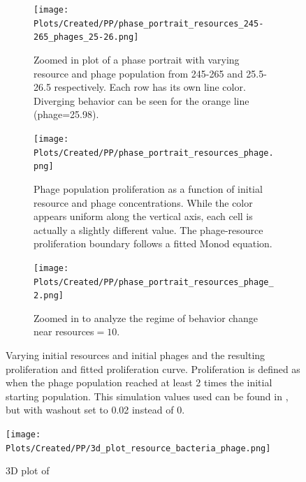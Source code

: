 \begin{figure}[]
    \centering
    \begin{subfigure}{0.49\linewidth}
        \centering
        \texttt{[image: Plots/Created/PP/phase\_portrait\_resources\_245-265\_phages\_25-26.png]}
        \caption{
            Zoomed in plot of a phase portrait with varying resource and phage population from 245-265 and 25.5-26.5 respectively. 
            Each row has its own line color. 
            Diverging behavior can be seen for the orange line (phage=25.98). 
        }
        \label{fig:created:phase_portrait_resources_245-265_phages_25-26}
    \end{subfigure}
    \hfill
    \begin{subfigure}{0.49\linewidth}
        \centering
        \texttt{[image: Plots/Created/PP/phase\_portrait\_resources\_phage.png]}
        \caption{
            Phage population proliferation as a function of initial resource and phage concentrations. 
            While the color appears uniform along the vertical axis, each cell is actually a slightly different value. 
            The phage-resource proliferation boundary follows a fitted Monod equation.
        }
        \label{fig:created:phase_portrait_resources_phage}
    \end{subfigure}
    \hfill
    \begin{subfigure}{0.49\linewidth}
        \centering
        \texttt{[image: Plots/Created/PP/phase\_portrait\_resources\_phage\_2.png]}
        \caption{
            Zoomed in to analyze the regime of behavior change near resources$=10$. 
        }
        \label{fig:created:phase_portrait_resources_phage_2}
    \end{subfigure}
    \caption{
        Varying initial resources and initial phages and the resulting proliferation and fitted proliferation curve. 
        Proliferation is defined as when the phage population reached at least 2 times the initial starting population. 
        This simulation values used can be found in , but with washout set to 0.02 instead of 0. 
    }
    \label{fig:created:phase_portrait_resource_phage_proliferate}
\end{figure}

\begin{figure}[]
    \texttt{[image: Plots/Created/PP/3d\_plot\_resource\_bacteria\_phage.png]}
    \centering
    \caption{
        3D plot of 
    \label{fig:created:3D_phase_portrait}
    }
\end{figure}

